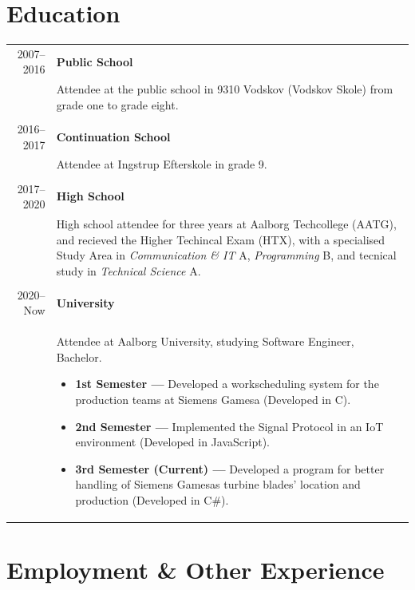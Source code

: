 \documentclass{article}
\begin{document}
    \section*{Education}
    \begin{tabular}{p{}|p{}} 
    \multicolumn{1}{r|}{2007--2016} & \textbf{Public School}\\
    &   Attendee at the public school in 9310 Vodskov (Vodskov Skole) from grade one to grade eight.
        \\\\
    \multicolumn{1}{r|}{2016--2017} & \textbf{Continuation School}\\
    &   Attendee at Ingstrup Efterskole in grade 9.
        \\\\
    \multicolumn{1}{r|}{2017--2020} & \textbf{High School}\\
    &   High school attendee for three years at Aalborg Techcollege (AATG), and recieved the Higher
            Techincal Exam (HTX), with a specialised Study Area in \textit{Communication \& IT} A,
            \textit{Programming} B, and tecnical study in \textit{Technical Science} A.
        \\\\
    \multicolumn{1}{r|}{2020--Now} & \textbf{University}\\
    &   Attendee at Aalborg University, studying Software Engineer, Bachelor.
        \begin{itemize}
            \item[] \textbf{1st Semester --- } Developed a workscheduling system for the production
                teams at Siemens Gamesa (Developed in C).
            \item[] \textbf{2nd Semester --- } Implemented the Signal Protocol in an IoT environment
                (Developed in JavaScript).
            \item[] \textbf{3rd Semester (Current) --- } Developed a program for better handling of
                Siemens Gamesas turbine blades' location and production (Developed in C\#).
        \end{itemize}
    \end{tabular}
 
    \section*{Employment \& Other Experience}
\end{document}
